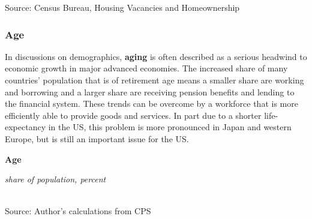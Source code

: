 \documentclass{report}
\newcommand{\tbllink}[1]{\href{https://raw.githubusercontent.com/bdecon/US-chartbook/master/chartbook/data/#1}{\faTable}}
\newcommand{\barylab}[2]{yticklabel style={text width=#1, align=right, 
		style={black!70}, text height=#2},}
\newcommand{\bbar}[2]{extra #1 ticks = {{#2}}, extra #1 tick labels = ,
		extra #1 tick style = {grid=major, grid style={thick, black!25}},}
\newcommand{\barplotnogrid}{xbar=0pt, axis line style={draw=none},
	    yticklabel style={align=left, anchor=east},
      		xmajorticks=false, ymajorgrids=false,   
	    ytick=data, tickwidth=0pt, area legend, reverse legend,
	    nodes near coords, nodes near coords align={horizontal},}
\begin{document}
{{{\begin{minipage}{0.76\textwidth}
\footnotesize{Source: Census Bureau, Housing Vacancies and Homeownership}  \hfill \tbllink{hhform.csv}

\end{minipage}

\newpage

\begin{minipage}{0.76\textwidth}

\subsubsection*{\color{black!70} \seriffont Age}

\small In discussions on demographics, \textbf{aging} is often described as a serious headwind to economic growth in major advanced economies. The increased share of many countries' population that is of retirement age means a smaller share are working and borrowing and a larger share are receiving pension benefits and lending to the financial system. These trends can be overcome by a workforce that is more efficiently able to provide goods and services. In part due to a shorter life-expectancy in the US, this problem is more pronounced in Japan and western Europe, but is still an important issue for the US.

\end{minipage}

\begin{minipage}{0.32\textwidth}
\normalsize \textbf{Age}

\footnotesize{\textit{share of population, percent}}

\hspace*{-4mm} \\
\footnotesize{Source: Author's calculations from CPS}
\end{minipage} \hspace{4mm}
\begin{minipage}{0.4\textwidth}
\small 
\end{minipage}


}}}
\end{document}

